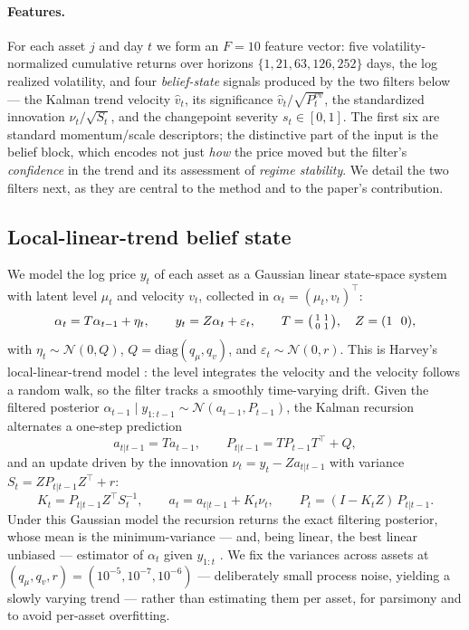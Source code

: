 \documentclass[11pt,a4paper]{article}
\theoremstyle{definition}
\begin{document}
\paragraph{Features.} For each asset $j$ and day $t$ we form an $F=10$ feature vector: five
volatility-normalized cumulative returns over horizons $\{1,21,63,126,252\}$ days, the log realized
volatility, and four \emph{belief-state} signals produced by the two filters below --- the Kalman
trend velocity $\hat v_t$, its significance $\hat v_t/\sqrt{P^{vv}_t}$, the standardized innovation
$\nu_t/\sqrt{S_t}$, and the changepoint severity $s_t\in[0,1]$. The first six are standard
momentum/scale descriptors; the distinctive part of the input is the belief block, which encodes not
just \emph{how} the price moved but the filter's \emph{confidence} in the trend and its assessment of
\emph{regime stability}. We detail the two filters next, as they are central to the method and to the
paper's contribution.

\subsection{Local-linear-trend belief state}
We model the log price $y_t$ of each asset as a Gaussian linear state-space system with latent level
$\mu_t$ and velocity $v_t$, collected in $\alpha_t=(\mu_t,v_t)^\top$:
\begin{equation}
\alpha_t = T\alpha_{t-1}+\eta_t,\qquad y_t = Z\alpha_t+\varepsilon_t,\qquad
T=\begin{psmallmatrix}1&1\\[1pt]0&1\end{psmallmatrix},\quad Z=(1\ \ 0),
\end{equation}
with $\eta_t\sim\mathcal N(0,Q)$, $Q=\mathrm{diag}(q_\mu,q_v)$, and $\varepsilon_t\sim\mathcal N(0,r)$.
This is Harvey's local-linear-trend model \cite{harvey1989}: the level integrates the velocity and
the velocity follows a random walk, so the filter tracks a smoothly time-varying drift. Given the
filtered posterior $\alpha_{t-1}\mid y_{1:t-1}\sim\mathcal N(a_{t-1},P_{t-1})$, the Kalman recursion
\cite{kalman1960} alternates a one-step prediction
\begin{equation}
a_{t|t-1}=Ta_{t-1},\qquad P_{t|t-1}=TP_{t-1}T^\top+Q,
\end{equation}
and an update driven by the innovation $\nu_t=y_t-Za_{t|t-1}$ with variance $S_t=ZP_{t|t-1}Z^\top+r$:
\begin{equation}
K_t=P_{t|t-1}Z^\top S_t^{-1},\qquad a_t=a_{t|t-1}+K_t\nu_t,\qquad P_t=(I-K_tZ)\,P_{t|t-1}.
\end{equation}
Under this Gaussian model the recursion returns the exact filtering posterior, whose mean is the
minimum-variance --- and, being linear, the best linear unbiased --- estimator of $\alpha_t$ given
$y_{1:t}$ \cite{kalman1960,harvey1989}. We fix the variances across assets at
$(q_\mu,q_v,r)=(10^{-5},10^{-7},10^{-6})$ --- deliberately small process noise, yielding a slowly
varying trend --- rather than estimating them per asset, for parsimony and to avoid per-asset
overfitting.
\end{document}
